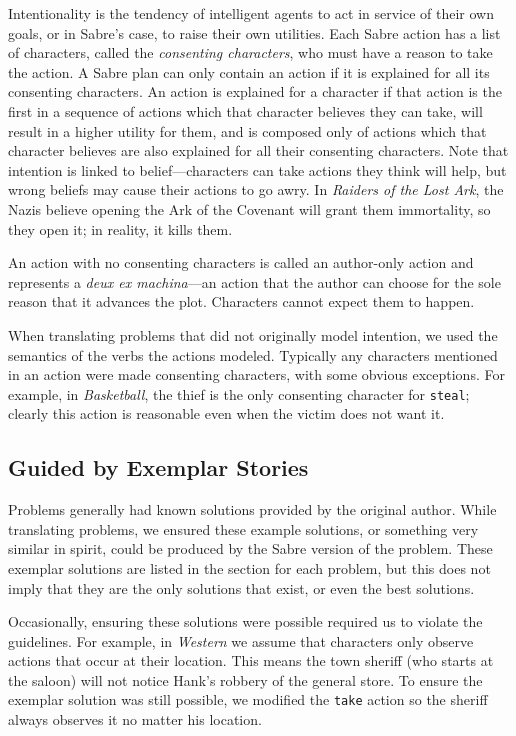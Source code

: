 \documentclass{nilreport}
\begin{document}
Intentionality is the tendency of intelligent agents to act in service
of their own goals, or in Sabre's case, to raise their own utilities.
Each Sabre action has a list of characters, called the \emph{consenting
characters}, who must have a reason to take the action. A Sabre plan
can only contain an action if it is explained for all its consenting
characters. An action is explained for a character if that action
is the first in a sequence of actions which that character believes
they can take, will result in a higher utility for them, and is composed
only of actions which that character believes are also explained for
all their consenting characters. Note that intention is linked to
belief---characters can take actions they think will help, but wrong
beliefs may cause their actions to go awry. In \emph{Raiders of the
Lost Ark}, the Nazis believe opening the Ark of the Covenant will
grant them immortality, so they open it; in reality, it kills them.

An action with no consenting characters is called an author-only action
and represents a \emph{deux ex machina}---an action that the author
can choose for the sole reason that it advances the plot. Characters
cannot expect them to happen.

When translating problems that did not originally model intention,
we used the semantics of the verbs the actions modeled. Typically
any characters mentioned in an action were made consenting characters,
with some obvious exceptions. For example, in \emph{Basketball}, the
thief is the only consenting character for \texttt{steal}; clearly
this action is reasonable even when the victim does not want it.

\subsection{Guided by Exemplar Stories}

Problems generally had known solutions provided by the original author.
While translating problems, we ensured these example solutions, or
something very similar in spirit, could be produced by the Sabre version
of the problem. These exemplar solutions are listed in the section
for each problem, but this does not imply that they are the only solutions
that exist, or even the best solutions.

Occasionally, ensuring these solutions were possible required us to
violate the guidelines. For example, in \emph{Western} we assume that
characters only observe actions that occur at their location. This
means the town sheriff (who starts at the saloon) will not notice
Hank's robbery of the general store. To ensure the exemplar solution
was still possible, we modified the \texttt{take} action so the sheriff
always observes it no matter his location.
\end{document}
